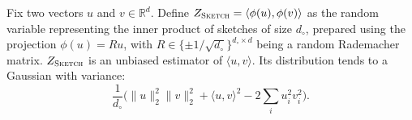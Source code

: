 \begin{theorem}
    \label{theorem:sketching:jl-variance-fixed-vectors}
    Fix two vectors $u$ and $v \in \mathbb{R}^d$.
    Define $Z_\textsc{Sketch} = \langle \phi(u), \phi(v) \rangle$ as the random
    variable representing the inner product of sketches of size $d_\circ$,
    prepared using the projection $\phi(u) = R u$, with $R \in \{\pm 1/\sqrt{d_\circ}\}^{d_\circ \times d}$
    being a random Rademacher matrix.
    $Z_\textsc{Sketch}$ is an unbiased estimator of $\langle u, v \rangle$.
    Its distribution tends to a Gaussian with variance:
    \begin{equation*}
    \frac{1}{d_\circ} \Big( \lVert u \rVert_2^2 \lVert v \rVert_2^2 + \langle u, v \rangle^2 - 2 \sum_i u_i^2 v_i^2  \Big).
    \end{equation*}
\end{theorem}
